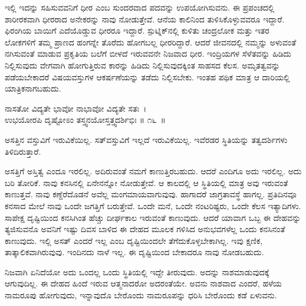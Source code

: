 ಇಲ್ಲಿ ಇದನ್ನು ಸಹಿಸುವವನಿಗೆ ಧೀರ ಎಂಬ ಸುಂದರವಾದ ಪದವನ್ನು ಉಪಯೋಗಿಸುವನು. ಈ ಪ್ರಪಂಚದಲ್ಲಿ ಶಾರೀರಕವಾಗಿ ಧೀರರಾದ ಅನೇಕರನ್ನು ನಾವು ನೋಡುತ್ತೇವೆ. ಆನೆಯ ಕಾಲಿನಿಂದ ತುಳಿಸಿಕೊಳ್ಳುವವರೂ ಇದ್ದಾರೆ. ಫಿರಂಗಿಯ ಬಾಯಿಗೆ ಎದೆಯೊಡ್ಡುವ ಧೀರರೂ ಇದ್ದಾರೆ. ಸ್ಪುಟ್ನಿಕ್​ನಲ್ಲಿ ಕುಳಿತು ಚಂದ್ರಲೋಕ ಮತ್ತು ಇತರ ಲೋಕಗಳಿಗೆ ತಮ್ಮ ಪ್ರಾಣದ ಹಂಗನ್ನೇ ತೊರೆದು ಹೋಗಬಲ್ಲ ಧೀರರಿದ್ದಾರೆ. ಆದರೆ ಜೀವನದಲ್ಲಿ ನಮ್ಮನ್ನು ಅಳುವಂತೆ ನಗಿಸುವಂತೆ ಮಾಡುವ ಪ್ರಕೃತಿಯ ಬಲೆಗೆ ಬೀಳದೆ ಇರುವವನೇ ನಿಜವಾದ ಧೀರ. ಇಂದ್ರಿಯಗಳ ಸೆಳೆತವನ್ನು ಹಿಡಿದು ನಿಲ್ಲಿಸುವುದು ವೇಗವಾಗಿ ಹೋಗುತ್ತಿರುವ ಕಾರನ್ನು ಹಿಡಿದು ನಿಲ್ಲಿಸುವುದಕ್ಕಿಂತ ಸಾಹಸದ ಕೆಲಸ. ಅಮೃತತ್ವವನ್ನು ಪಡೆಯಬೇಕಾದರೆ ವಿಷಯವಸ್ತುಗಳ ಆಕರ್ಷಣೆಯನ್ನು ತಡೆದು ನಿಲ್ಲಿಸಬೇಕು. ಇಂತಹ ಪಥಿಕ ಮಾತ್ರ ಆ ದಾರಿಯಲ್ಲಿ ಯಾತ್ರಿಕನಾಗಬಹುದು.

\begin{shloka}
ನಾಸತೋ ವಿದ್ಯತೇ ಭಾವೋ ನಾಭಾವೋ ವಿದ್ಯತೇ ಸತಃ~।\\ಉಭಯೋರಪಿ ದೃಷ್ಟೋಽಂ ತಸ್ತ್ವನಯೋಸ್ತತ್ತ್ವದರ್ಶಿಭಿಃ \hfill॥ ೧೬~॥
\end{shloka}

\begin{artha}
ಅಸತ್ತಿನ ವಸ್ತುವಿಗೆ ಇರುವಿಕೆಯಿಲ್ಲ. ಸತ್​ವಸ್ತುವಿಗೆ ಇಲ್ಲದೆ ಇರುವಿಕೆಯಿಲ್ಲ. ಇವೆರಡರ ಸ್ಥಿತಿಯನ್ನು ತತ್ವದರ್ಶಿಗಳು ತಿಳಿದಿರುತ್ತಾರೆ.
\end{artha}

ಅಸತ್ತಿಗೆ ಅಸ್ತಿತ್ವ ಎಂದೂ ಇರಲಿಲ್ಲ. ಅದಿರುವಂತೆ ನಮಗೆ ಕಾಣುತ್ತಿರಬಹುದು. ಆದರೆ ಎಂದಿಗೂ ಅದು ಇರಲಿಲ್ಲ. ಅದು ಬರಿ ತೋರಿಕೆ. ನಾವು ಕನಸಿನಲ್ಲಿ ಏನೇನನ್ನೋ ನೋಡುತ್ತೇವೆ. ಆ ಕಾಲದಲ್ಲಿ ಆ ಸ್ಥಿತಿಯಲ್ಲಿ ಮಾತ್ರ ಅವು ಇರುವಂತೆ ಕಾಣುತ್ತವೆ. ನಾವು ಕಣ್ದೆರೆದೊಡನೆ ಅವೆಲ್ಲ ಮಂಗಮಾಯವಾಗುವುವು. ಹಾಗಾದರೆ ಜಾಗ್ರತಾವಸ್ಥೆ ಹಾಗಲ್ಲ. ಪ್ರತಿದಿನವೂ ಕನಸಾದ ಮೇಲೆ ನಾವು ಒಂದೇ ಜಗತ್ತಿಗೆ ಬರುತ್ತೇವೆ. ಒಂದೇ ಮನೆ, ಒಂದೇ ನಂಟರಿಷ್ಟರು, ಒಂದೇ ಕೆಲಸ ಇತ್ಯಾದಿಗಳು. ಸಾಪೇಕ್ಷ ದೃಷ್ಟಿಯಿಂದ ಕನಸಿಗಿಂತ ಹೆಚ್ಚು ದೀರ್ಘಕಾಲ ಇರುವಂತೆ ಕಾಣುವುದು. ಆದರೆ ಯಾವಾಗ ಒಬ್ಬ ಈ ದೇಹವನ್ನು ತ್ಯಜಿಸುವನೊ ಅವನಿಗೆ ಇಷ್ಟು ದಿವಸ ಬಾಳಿದ ಈ ದೇಹದ ಮೂಲಕ ಗಳಿಸಿದ ಅನುಭವಗಳೆಲ್ಲ ಒಂದು ಕನಸಿನಂತೆ ಕಾಣುವುದು. ಇಲ್ಲಿ ಅಸತ್ ಎಂದರೆ ಇಲ್ಲ ಎಂಬ ದೃಷ್ಟಿಯಿಂದಲೇ ತೆಗೆದುಕೊಳ್ಳಬೇಕಾಗಿಲ್ಲ. ಇವು ಕ್ಷಣಿಕ, ತಾತ್ಕಾಲಿಕವಾಗಿರುವುವು. ಇಂದಿನದು ನಾಳೆ ಇಲ್ಲ. ಈ ದೃಷ್ಟಿಯಿಂದ ಬೇಕಾದರೂ ನಾವು ನೋಡಬಹುದು.

ನಿಜವಾಗಿ ಏನಿದೆಯೋ ಅದು ಒಂದಲ್ಲ ಒಂದು ಸ್ಥಿತಿಯಲ್ಲಿ ಇದ್ದೇ ತೀರುವುದು. ಅದನ್ನು ನಾಶಮಾಡುವುದಕ್ಕೆ ಆಗುವುದಿಲ್ಲ. ಈ ದೇಹದ ಹಿಂದೆ ಇರುವ ಆತ್ಮನಾದರೋ ಅದರಂತೆಯೇ. ಅವನು ನಾಶವಾದ ಎಂದರೆ, ಹಳೆಯ ನಾಮರೂಪು ಹೋಗುವುದು, ಇನ್ನಾವುದೊ ಬೇರೊಂದು ನಾಮರೂಪನ್ನು ಧರಿಸಿ ಬೇರೊಂದು ಕಡೆ ಏಳುವನು.

